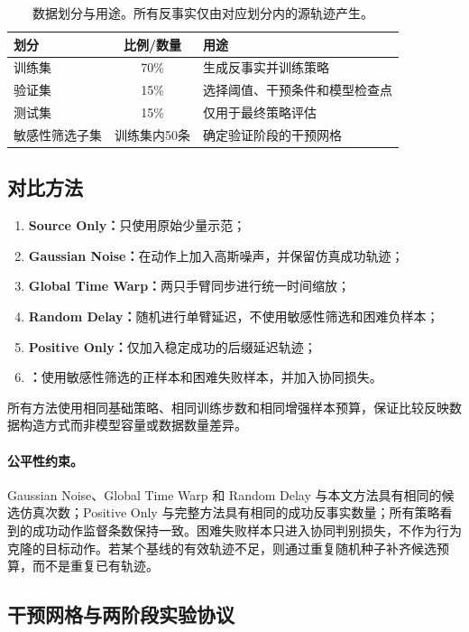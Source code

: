 \begin{table}[t]
\centering
\caption{数据划分与用途。所有反事实仅由对应划分内的源轨迹产生。}
\label{tab:split}
\begin{tabular}{lcl}
\toprule
划分 & 比例/数量 & 用途 \\
\midrule
训练集 & 70\% & 生成反事实并训练策略 \\
验证集 & 15\% & 选择阈值、干预条件和模型检查点 \\
测试集 & 15\% & 仅用于最终策略评估 \\
敏感性筛选子集 & 训练集内50条 & 确定验证阶段的干预网格 \\
\bottomrule
\end{tabular}
\end{table}

\subsection{对比方法}

\begin{enumerate}
    \item \textbf{Source Only：}只使用原始少量示范；
    \item \textbf{Gaussian Noise：}在动作上加入高斯噪声，并保留仿真成功轨迹；
    \item \textbf{Global Time Warp：}两只手臂同步进行统一时间缩放；
    \item \textbf{Random Delay：}随机进行单臂延迟，不使用敏感性筛选和困难负样本；
    \item \textbf{Positive Only：}仅加入稳定成功的后缀延迟轨迹；
    \item \textbf{\method{}：}使用敏感性筛选的正样本和困难失败样本，并加入协同损失。
\end{enumerate}

所有方法使用相同基础策略、相同训练步数和相同增强样本预算，保证比较反映数据构造方式而非模型容量或数据数量差异。

\paragraph{公平性约束。}
Gaussian Noise、Global Time Warp 和 Random Delay 与本文方法具有相同的候选仿真次数；Positive Only 与完整方法具有相同的成功反事实数量；所有策略看到的成功动作监督条数保持一致。困难失败样本只进入协同判别损失，不作为行为克隆的目标动作。若某个基线的有效轨迹不足，则通过重复随机种子补齐候选预算，而不是重复已有轨迹。

\subsection{干预网格与两阶段实验协议}

